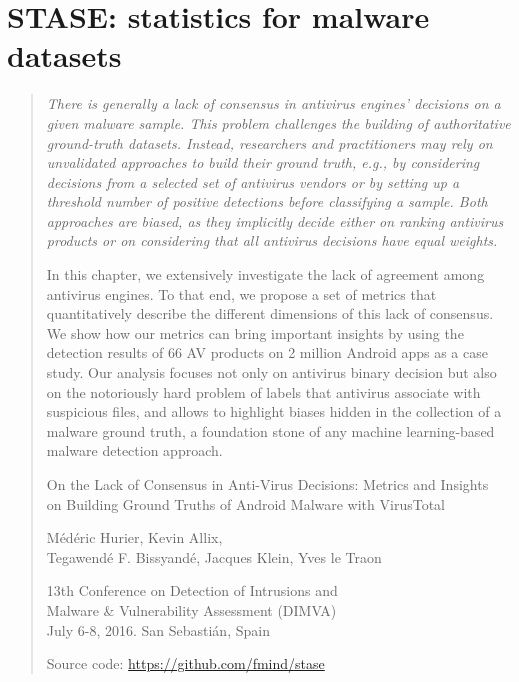 \chapter{STASE: statistics for malware datasets}
\label{chapter:stase}

\begin{quote}
{\itshape
There is generally a lack of consensus in antivirus engines' decisions on a given malware sample. This problem challenges the building of authoritative ground-truth datasets. Instead, researchers and practitioners may rely on unvalidated approaches to build their ground truth, e.g., by considering decisions from a selected set of antivirus vendors or by setting up a threshold number of positive detections before classifying a sample. Both approaches are biased, as they implicitly decide either on ranking antivirus products or on considering that all antivirus decisions have equal weights.
    
In this chapter, we extensively investigate the lack of agreement among antivirus engines. To that end, we propose a set of metrics that quantitatively describe the different dimensions of this lack of consensus. We show how our metrics can bring important insights by using the detection results of 66 AV products on 2 million Android apps as a case study. Our analysis focuses not only on antivirus binary decision but also on the notoriously hard problem of labels that antivirus associate with suspicious files, and allows to highlight biases hidden in the collection of a malware ground truth, a foundation stone of any machine learning-based malware detection approach.

\vfill

\begin{center}
On the Lack of Consensus in Anti-Virus Decisions: Metrics and Insights \\ on Building Ground Truths of Android Malware with VirusTotal

Médéric Hurier, Kevin Allix, \\ Tegawendé F. Bissyandé, Jacques Klein, Yves le Traon

13th Conference on Detection of Intrusions and \\ Malware \& Vulnerability Assessment (DIMVA) \\
July 6-8, 2016. San Sebastián, Spain

Source code: \url{https://github.com/fmind/stase}
\end{center}
}
\end{quote}

